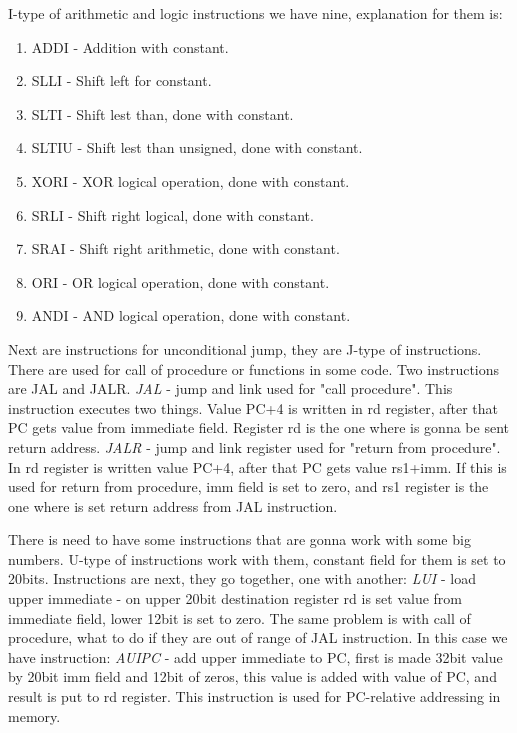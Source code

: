 \documentclass{scrreprt}
\begin{document}
    I-type of arithmetic and logic instructions we have nine, explanation for them is:

    \begin{enumerate}
        \item ADDI - Addition with constant.  
        \item SLLI - Shift left for constant. 
        \item SLTI - Shift lest than, done with constant. 
        \item SLTIU - Shift lest than unsigned, done with constant. 
        \item XORI - XOR logical operation, done with constant. 
        \item SRLI - Shift right logical, done with constant. 
        \item SRAI - Shift right arithmetic, done with constant. 
        \item ORI - OR logical operation, done with constant. 
        \item ANDI - AND logical operation, done with constant.
    \end{enumerate}

    Next are instructions for unconditional jump, they are J-type of instructions. There are used for call of procedure or functions in some code. Two instructions are JAL and JALR.
    \textit{JAL} - jump and link used for "call procedure". This instruction executes two things. Value PC+4 is written in rd register, after that PC gets value from immediate field. Register rd is the one where is gonna be sent return address. 
    \textit{JALR} - jump and link register used for "return from procedure". In rd register is written value PC+4, after that PC gets value rs1+imm. If this is used for return from procedure, imm field is set to zero, and rs1 register is the one where is set return address from JAL instruction. 
    
    \hfill \break
    There is need to have some instructions that are gonna work with some big numbers. U-type of instructions work with them, constant field for them is set to 20bits. Instructions are next, they go together, one with another:
    \textit{LUI} - load upper immediate - on upper 20bit destination register rd is set value from immediate field, lower 12bit is set to zero. 
    The same problem is with call of procedure, what to do if they are out of range of JAL instruction. In this case we have instruction:
    \textit{AUIPC} - add upper immediate to PC, first is made 32bit value by  20bit imm field and 12bit of zeros, this value is added with value of PC, and result is put to rd register. This instruction is used for PC-relative addressing in memory.   
\end{document}
